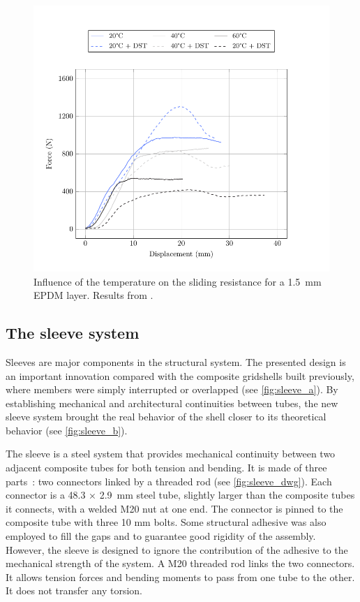 \begin{figure}[p]
\centering
\begin{fullpage}
	\includegraphics[]{ch2a_creteil/plot/2_epdm_temperature/build.pdf}
	\caption[Influence of the temperature on the sliding resistance]{Influence of the temperature on the sliding resistance for a \SI{1.5}{\mm} EPDM layer. Results from \cite{Tayeb2015a}.}
	\label{plot:epdm_temperature}
\end{fullpage}
\end{figure}


\clearpage
\subsection{The sleeve system}

Sleeves are major components in the structural system. The presented design is an important innovation compared with the composite gridshells built previously, where members were simply interrupted or overlapped (see \cref{fig:sleeve_a}). By establishing mechanical and architectural continuities between tubes, the new sleeve system brought the real behavior of the shell closer to its theoretical behavior (see \cref{fig:sleeve_b}).

The sleeve is a steel system that provides mechanical continuity between two adjacent composite tubes for both tension and bending. It is made of three parts~: two connectors linked by a threaded rod (see \cref{fig:sleeve_dwg}). Each connector is a 48.3 × \SI{2.9}{mm} steel tube, slightly larger than the composite tubes it connects, with a welded M20 nut at one end. The connector is pinned to the composite tube with three 10 mm bolts. Some structural adhesive was also employed to fill the gaps and to guarantee good rigidity of the assembly. However, the sleeve is designed to ignore the contribution of the adhesive to the mechanical strength of the system. A M20 threaded rod links the two connectors. It allows tension forces and bending moments to pass from one tube to the other. It does not transfer any torsion.

